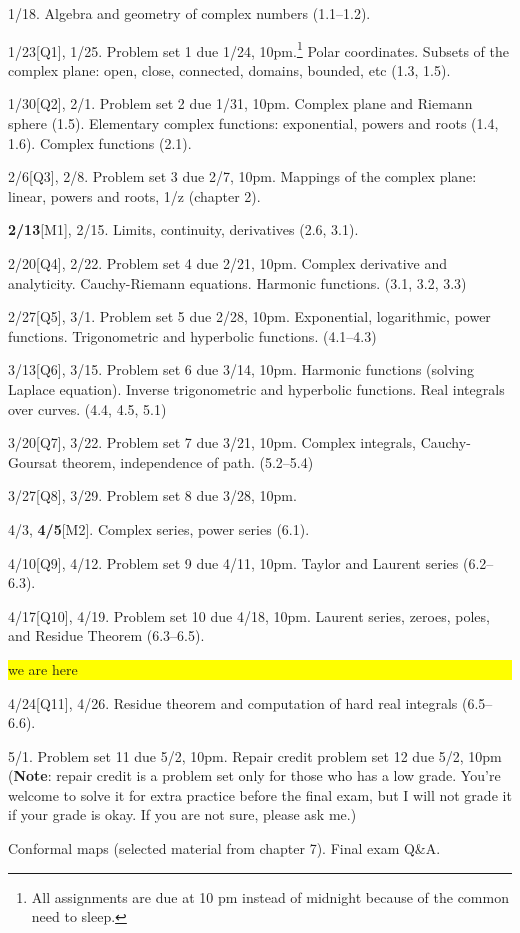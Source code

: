 \documentclass[oneside,11pt]{amsart}
\begin{document}
\begin{enumerate}[\bf{}{[}week 1{]}]
	\item 1/18. Algebra and geometry of complex numbers (1.1--1.2).
	\item 1/23[Q1], 1/25. Problem set 1 due 1/24, 10pm.\footnote{All assignments are due at 10 pm instead of midnight because of the common need to sleep.}
		Polar coordinates. Subsets of the complex plane: open, close, connected, domains, bounded, etc (1.3, 1.5).
	\item 1/30[Q2], 2/1. Problem set 2 due 1/31, 10pm.
		Complex plane and Riemann sphere (1.5).
		Elementary complex functions: exponential, powers and roots (1.4, 1.6).
		Complex functions (2.1).
	\item 2/6[Q3], 2/8. Problem set 3 due 2/7, 10pm.
		Mappings of the complex plane: linear, powers and roots, 1/z (chapter 2).
	\item \textbf{2/13}[M1], 2/15.
		Limits, continuity, derivatives
		(2.6, 3.1).
	\item 2/20[Q4], 2/22. Problem set 4 due 2/21, 10pm.
		Complex derivative and analyticity. Cauchy-Riemann equations.  Harmonic functions.
		(3.1, 3.2, 3.3)
	\item 2/27[Q5], 3/1. Problem set 5 due 2/28, 10pm.
		Exponential, logarithmic, power functions.
		Trigonometric and hyperbolic functions. 
		(4.1--4.3)
	\item 3/13[Q6], 3/15. Problem set 6 due 3/14, 10pm.
		Harmonic functions (solving Laplace equation). 
		Inverse trigonometric and hyperbolic functions. 
		Real integrals over curves.
		(4.4, 4.5, 5.1)
	\item 3/20[Q7], 3/22. Problem set 7 due 3/21, 10pm.
		Complex integrals, Cauchy-Goursat theorem, independence of path.
		(5.2--5.4)
	\item 3/27[Q8], 3/29. Problem set 8 due 3/28, 10pm.
	\item 4/3, \textbf{4/5}[M2]. 
		Complex series, power series (6.1).
	\item 4/10[Q9], 4/12. Problem set 9 due 4/11, 10pm.
		Taylor and Laurent series (6.2--6.3).
	\item 4/17[Q10], 4/19. Problem set 10 due 4/18, 10pm.
		Laurent series, zeroes, poles, and Residue Theorem
		(6.3--6.5).

		\colorbox{yellow}{\parbox{.7\textwidth}{we are here}}
	\item 4/24[Q11], 4/26. 
		Residue theorem and computation of hard real integrals (6.5--6.6). 
	\item 5/1. Problem set 11 due 5/2, 10pm. Repair credit problem set 12 due 5/2, 10pm
		(\textbf{Note}: repair credit is a problem set only for those who has a low grade. You're welcome to solve it 
		for extra practice before the final exam, but I will not grade it if your grade is okay. 
		If you are not sure, please ask me.)

		\noindent Conformal maps (selected material from chapter 7).
		Final exam Q{}\&A.
\end{enumerate}
\end{document}
